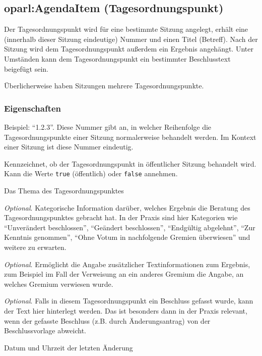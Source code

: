 \documentclass[,a4paper]{article}
\begin{document}
\subsection{oparl:AgendaItem
(Tagesordnungspunkt)}\label{oparlux5fagendaitem}

Der Tagesordnungspunkt wird für eine bestimmte Sitzung angelegt, erhält
eine (innerhalb dieser Sitzung eindeutige) Nummer und einen Titel
(Betreff). Nach der Sitzung wird dem Tagesordnungspunkt außerdem ein
Ergebnis angehängt. Unter Umständen kann dem Tagesordnungspunkt ein
bestimmter Beschlusstext beigefügt sein.

Überlicherweise haben Sitzungen mehrere Tagesordnungspunkte.

\subsubsection{Eigenschaften}\label{eigenschaften-5}

\begin{description}
\itemsep1pt\parskip0pt
\item[Nummer (\texttt{identifier})]
Beispiel: ``1.2.3''. Diese Nummer gibt an, in welcher Reihenfolge die
Tagesordnungspunkte einer Sitzung normalerweise behandelt werden. Im
Kontext einer Sitzung ist diese Nummer eindeutig.
\item[Öffentlich (\texttt{public})]
Kennzeichnet, ob der Tagesordnungspunkt in öffentlicher Sitzung
behandelt wird. Kann die Werte \texttt{true} (öffentlich) oder
\texttt{false} annehmen.
\item[Titel (\texttt{title})]
Das Thema des Tagesordnungspunktes
\item[Ergebnis (\texttt{result})]
\emph{Optional}. Kategorische Information darüber, welches Ergebnis die
Beratung des Tagesordnungspunktes gebracht hat. In der Praxis sind hier
Kategorien wie ``Unverändert beschlossen'', ``Geändert beschlossen'',
``Endgültig abgelehnt'', ``Zur Kenntnis genommen'', ``Ohne Votum in
nachfolgende Gremien überwiesen'' und weitere zu erwarten.
\item[Ergebnis Details (\texttt{result\_details})]
\emph{Optional}. Ermöglicht die Angabe zusätzlicher Textinformationen
zum Ergebnis, zum Beispiel im Fall der Verweisung an ein anderes Gremium
die Angabe, an welches Gremium verwiesen wurde.
\item[Beschlusstext (\texttt{resolution\_text})]
\emph{Optional}. Falls in diesem Tagesordnungspunkt ein Beschluss
gefasst wurde, kann der Text hier hinterlegt werden. Das ist besonders
dann in der Praxis relevant, wenn der gefasste Beschluss (z.B. durch
Änderungsantrag) von der Beschlussvorlage abweicht.
\item[Zuletzt geändert (\texttt{last\_modified})]
Datum und Uhrzeit der letzten Änderung
\end{description}
\end{document}
